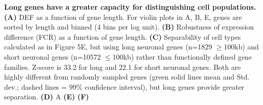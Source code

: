 \textbf{Long genes have a greater capacity for distinguishing cell populations. (A)} DEF as a function of gene length. For violin plots in A, B, E, genes are sorted by length and binned (4 bins per log unit). \textbf{(B)} Robustness of expression difference (FCR) as a function of gene length. \textbf{(C)} Separability of cell types calculated as in Figure 5E, but using long neuronal genes (n=1829 $\geq$100kb) and short neuronal genes (n=10572 $\leq$100kb) rather than functionally defined gene families. Z-score is 33.2 for long and 22.1 for short neuronal genes. Both are highly different from randomly sampled genes (green solid lines mean and Std. dev.; dashed lines = 99\% confidence interval), but long genes provide greater separation. \textbf{(D)} A \textbf{(E)}  \textbf{(F)}   